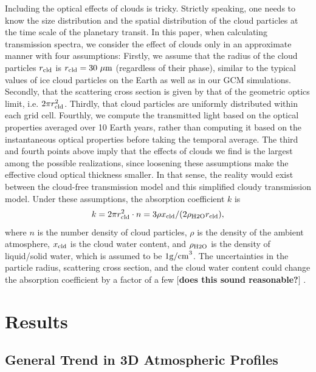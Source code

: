 \documentclass[11pt,numberedappendix,twocolappendix,]{emulateapj}
\def\memo#1{\color{red}$[${\bf #1}$]$ \color{black}}
\begin{document}
Including the optical effects of clouds is tricky. 
Strictly speaking, one needs to know the size distribution and the spatial distribution of the cloud particles at the time scale of the planetary transit. 
In this paper, when calculating transmission spectra, we consider the effect of clouds only in an approximate manner with four assumptions:
%
Firstly, we assume that the radius of the cloud particles $r_{\rm cld}$ is $r_{\rm cld}=30~\mu {\rm m}$ (regardless of their phase), similar to the typical values of ice cloud particles on the Earth as well as in our GCM simulations.  
%
Secondly, that the scattering cross section is given by that of the geometric optics limit, i.e. $2 \pi r_{\rm cld}^2$. 
%
Thirdly, that cloud particles are uniformly distributed within each grid cell. 
%
Fourthly, we compute the transmitted light based on the optical properties averaged over 10 Earth years, rather than computing it based on the instantaneous optical properties before taking the temporal average. 
%
The third and fourth points above imply that the effects of clouds we find is the largest among the possible realizations, since loosening these assumptions make the effective cloud optical thickness smaller. 
In that sense, the reality would exist between the cloud-free transmission model and this simplified cloudy transmission model. 
Under these assumptions, the absorption coefficient $k$ is %
\begin{equation}
k = 2 \pi r_{\rm cld}^2 \cdot n = 3 \rho x_{\rm cld} / ( 2 \rho_{\rm H2O} r_{\rm cld} ),
\end{equation}
where $n$ is the number density of cloud particles, $\rho $ is the density of the ambient atmosphere, $x_{\rm cld}$ is the cloud water content, and $\rho_{\rm H2O}$ is the density of liquid/solid water, which is assumed to be $1 {\rm g/cm}^3$. 
The uncertainties in the particle radius, scattering cross section, and the cloud water content could change the absorption coefficient by a factor of a few \memo{does this sound reasonable?}. 

\section{Results}
\label{s:results}


\subsection{General Trend in 3D Atmospheric Profiles}
\label{ss:result_H2Omixingratio}
\end{document}
